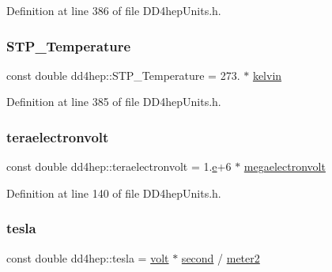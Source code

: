 Definition at line 386 of file D\+D4hep\+Units.\+h.

\hypertarget{namespacedd4hep_a3036c66b7815e25873b1183c2af953d6}{}\label{namespacedd4hep_a3036c66b7815e25873b1183c2af953d6} 
\subsubsection{\texorpdfstring{S\+T\+P\+\_\+\+Temperature}{STP\_Temperature}}
{\footnotesize\ttfamily const double dd4hep\+::\+S\+T\+P\+\_\+\+Temperature = 273. $\ast$ \hyperlink{namespacedd4hep_ae4984489719e11b38858934cc4c1e54e}{kelvin}\hspace{0.3cm}{\ttfamily [static]}}



Definition at line 385 of file D\+D4hep\+Units.\+h.

\hypertarget{namespacedd4hep_ac482cce1ba221816734b1a3384f958d9}{}\label{namespacedd4hep_ac482cce1ba221816734b1a3384f958d9} 
\subsubsection{\texorpdfstring{teraelectronvolt}{teraelectronvolt}}
{\footnotesize\ttfamily const double dd4hep\+::teraelectronvolt = 1.\hyperlink{_volumes_8cpp_a8a9a1f93e9b09afccaec215310e64142}{e}+6 $\ast$ \hyperlink{namespacedd4hep_a4e39beba039f7a6bda24a7031c121b2a}{megaelectronvolt}\hspace{0.3cm}{\ttfamily [static]}}



Definition at line 140 of file D\+D4hep\+Units.\+h.

\hypertarget{namespacedd4hep_aaddab60c1ddca9986195f0d5cfe03259}{}\label{namespacedd4hep_aaddab60c1ddca9986195f0d5cfe03259} 
\subsubsection{\texorpdfstring{tesla}{tesla}}
{\footnotesize\ttfamily const double dd4hep\+::tesla = \hyperlink{namespacedd4hep_a1bbac6ed4a69b41427c9a44a513e2500}{volt} $\ast$ \hyperlink{namespacedd4hep_ac03364576705a245265d8ed6ea26b871}{second} / \hyperlink{namespacedd4hep_afe718b0d811af6b4d45c556e3a0e87a3}{meter2}\hspace{0.3cm}{\ttfamily [static]}}



